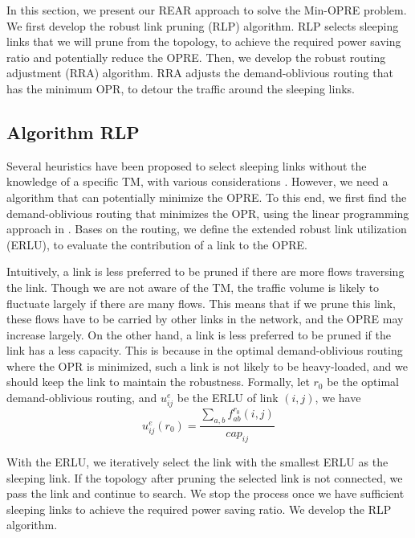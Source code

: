 \documentclass[conference]{IEEEtran}
\begin{document}
In this section, we present our REAR approach to solve the Min-OPRE problem. We first develop the robust link pruning (RLP) algorithm. RLP selects sleeping links that we will prune from the topology, to achieve the required power saving ratio and potentially reduce the OPRE. Then, we develop the robust routing adjustment (RRA) algorithm. RRA adjusts the demand-oblivious routing that has the minimum OPR, to detour the traffic around the sleeping links.

\subsection{Algorithm RLP}

Several heuristics have been proposed to select sleeping links without the knowledge of a specific TM, with various considerations \cite{}\cite{}\cite{}. However, we need a algorithm that can potentially minimize the OPRE. To this end, we first find the demand-oblivious routing that minimizes the OPR, using the linear programming approach in \cite{networking:oblivious}. Bases on the routing, we define the extended robust link utilization (ERLU), to evaluate the contribution of a link to the OPRE.

Intuitively, a link is less preferred to be pruned if there are more flows traversing the link. Though we are not aware of the TM, the traffic volume is likely to fluctuate largely if there are many flows. This means that if we prune this link, these flows have to be carried by other links in the network, and the OPRE may increase largely. On the other hand, a link is less preferred to be pruned if the link has a less capacity. This is because in the optimal demand-oblivious routing where the OPR is minimized, such a link is not likely to be heavy-loaded, and we should keep the link to maintain the robustness. Formally, let $r_0$ be the optimal demand-oblivious routing, and $u^e_{ij}$ be the ERLU of link $(i, j)$, we have
\begin{equation}
\label{equation_u_eijr}
	u^e_{ij}(r_0) = \frac {\sum_{a,b}f^{r_0}_{ab}(i,j)} {cap_{ij}}
\end{equation}

With the ERLU, we iteratively select the link with the smallest ERLU as the sleeping link. If the topology after pruning the selected link is not connected, we pass the link and continue to search. We stop the process once we have sufficient sleeping links to achieve the required power saving ratio. We develop the RLP algorithm.
\end{document}
